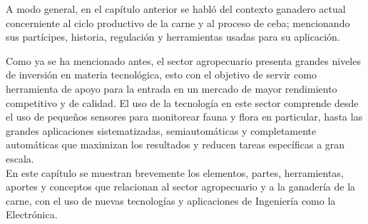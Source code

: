 
A modo general, en el capítulo anterior se habló del contexto ganadero actual concerniente al ciclo productivo de la carne y al proceso de ceba; mencionando sus partícipes, historia, regulación y herramientas usadas para su aplicación.

Como ya se ha mencionado antes, el sector agropecuario presenta grandes niveles de inversión en materia tecnológica, esto con el objetivo de servir como herramienta de apoyo para la entrada en un mercado de mayor rendimiento competitivo y de calidad. El uso de la tecnología en este sector comprende desde el uso de pequeños sensores para monitorear fauna y flora en particular, hasta las grandes aplicaciones sistematizadas, semiautomáticas y completamente automáticas que maximizan los resultados y reducen tareas específicas a gran escala. \\

En este capítulo se muestran brevemente los elementos, partes, herramientas, aportes y conceptos que relacionan al sector agropecuario y a la ganadería de la carne, con el uso de nuevas tecnologías y aplicaciones de Ingeniería como la Electrónica.\\






